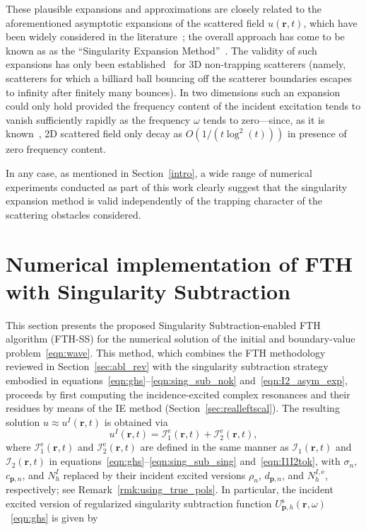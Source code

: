 \documentclass[11pt]{article}
\theoremstyle{plain}
\theoremstyle{remark}
\def \br{\mathbf{r}}
\def \bp{\mathbf{p}}
\begin{document}
These plausible expansions and approximations are closely related to
the aforementioned asymptotic expansions of the scattered field
$u(\br,t)$, which have been widely considered in the
literature~\cite{meylan2012complex,hazard2007singularity,baum2005singularity,meylan2014singularity,lalanne2018light};
the overall approach has come to be known as as the ``Singularity
Expansion Method''~\cite{baum2005singularity}.  The validity of such
expansions has only been
established~\cite{lax1969decaying,lax2005exponential,
  tang2000resonance, martin2021time} for 3D non-trapping scatterers
(namely, scatterers for which a billiard ball bouncing off the
scatterer boundaries escapes to infinity after finitely many
bounces). In two dimensions such an expansion could only hold provided
the frequency content of the incident excitation tends to vanish
sufficiently rapidly as the frequency $\omega$ tends to zero---since,
as it is known~\cite{muraveui1979asymptotic}, 2D scattered field only
decay as $O(1/(t\log^2(t)))$ in presence of zero frequency content.

In any case, as mentioned in Section~\ref{intro}, a wide range of
numerical experiments conducted as part of this work clearly suggest
that the singularity expansion method is valid independently of the
trapping character of the scattering obstacles considered.


\section{Numerical implementation of FTH with Singularity
  Subtraction}\label{sec:Num_Imp}

This section presents the proposed Singularity Subtraction-enabled FTH
algorithm (FTH-SS) for the numerical solution of the initial and
boundary-value problem~\eqref{eqn:wave}. This method, which combines
the FTH methodology reviewed in Section~\ref{sec:abl_rev} with the
singularity subtraction strategy embodied in
equations~\eqref{eqn:ghs}--\eqref{eqn:sing_sub_nok}
and~\eqref{eqn:I2_asym_exp}, proceeds by first computing the
incidence-excited complex resonances and their residues by means of
the IE method (Section~\ref{sec:realleftscal}). The resulting solution $u\approx u^I(\br,t)$ is obtained via
\begin{equation}
    u^I(\br,t) = \mathcal{I}_1^\mathrm{e}(\br,t) + \mathcal{I}_2^\mathrm{e}(\br,t),
\end{equation}
where $\mathcal{I}_1^\mathrm{e}(\br,t)$ and
$\mathcal{I}_2^\mathrm{e}(\br,t)$ are defined in the same manner as
$\mathcal{I}_1(\br,t)$ and $\mathcal{I}_2(\br,t)$ in
equations~\eqref{eqn:ghs}--\eqref{eqn:sing_sub_sing}
and~\eqref{eqn:I1I2tok}, with $\sigma_n$, $c_{\bp,n}$, and $N_h^I$
replaced by their incident excited versions $\rho_n$, $d_{\bp,n}$, and
$N^{I,\mathrm{e}}_h$, respectively; see
Remark~\ref{rmk:using_true_pols}. In particular, the incident excited
version of regularized singularity subtraction function
$U_{\bp,h}^\mathrm{s}(\br,\omega)$~\eqref{eqn:ghs} is given by
\end{document}
